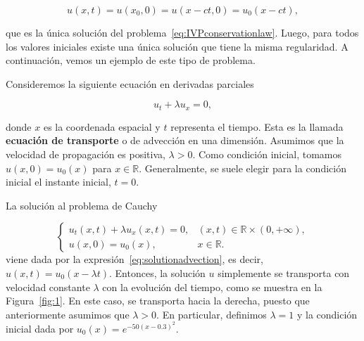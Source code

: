 \begin{equation}\label{eq:solutionadvection}
  u\left(x,t\right)=
  u\left(x_{0},0\right)=
  u\left(x-ct,0\right)=
  u_{0}\left(x-ct\right),
\end{equation}

que es la única solución del problema~\eqref{eq:IVPconservationlaw}.
Luego, para todos los valores iniciales existe una única solución que
tiene la misma regularidad.
A continuación, vemos un ejemplo de este tipo de problema.

\begin{example}
  Consideremos la siguiente ecuación en derivadas parciales

  \begin{equation*}
    u_{t}+
    \lambda u_{x}=
    0,
  \end{equation*}

  donde $x$ es la coordenada espacial y $t$ representa el tiempo.
  Esta es la llamada \textbf{ecuación de transporte} o de advección
  en una dimensión.
  Asumimos que la velocidad de propagación es positiva, $\lambda>0$.
  Como condición inicial, tomamos
  \begin{math}
    u\left(x,0\right)=
    u_{0}\left(x\right)
  \end{math}
  para $x\in\mathbb{R}$.
  Generalmente, se suele elegir para la condición inicial el instante
  inicial, $t=0$.

  La solución al problema de Cauchy

  \begin{equation*}
    \begin{cases}
      u_{t}
      \left(x,t\right)+
      \lambda
      u_{x}
      \left(x,t\right)=
      0,                   &
      \left(x,t\right)\in
      \mathbb{R}\times
      \left(0,+\infty\right), \\
      u\left(x,0\right)=
      u_{0}\left(x\right), &
      x\in\mathbb{R}.
    \end{cases}
  \end{equation*}
  viene dada por la expresión~\eqref{eq:solutionadvection}, es decir,
  $u\left(x,t\right)=u_{0}\left(x-\lambda t\right)$.
  Entonces, la solución $u$ simplemente se transporta con velocidad
  constante $\lambda$ con la evolución del tiempo, como se muestra en
  la Figura~\ref{fig:1}.
  En este caso, se transporta hacia la derecha, puesto que
  anteriormente asumimos que $\lambda>0$.
  En particular, definimos $\lambda=1$ y la condición inicial dada
  por
  \begin{math}
    u_{0}
    \left(x\right)=
    e^{-50{\left(x-0.3\right)}^{2}}
  \end{math}.
\end{example}

